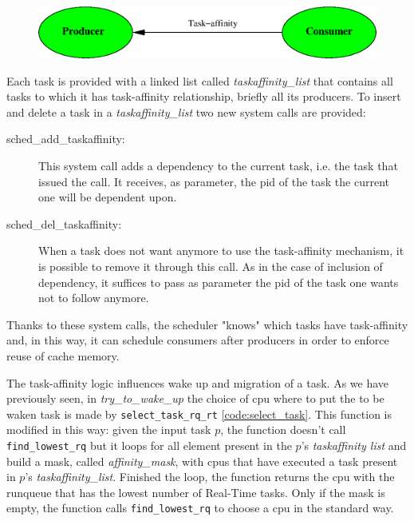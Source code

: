 \begin{figure}[htbp]
\centering
\includegraphics[width=\widefigure]{images/taskaff-rel.eps}
\caption{}
\label{fig:taskaff-rel}
\end{figure}

Each task is provided with a linked list called \textit{taskaffinity\_list} that contains all tasks to which it has task-affinity relationship, briefly 
all its producers. To insert and delete a task in a \textit{taskaffinity\_list} two new system calls are provided:

\begin{description}

\item[sched\_add\_taskaffinity:] This system call adds a dependency to the current task, i.e. the task that issued the call. It receives, as parameter, the 
pid of the task the current one will be dependent upon.

\item[sched\_del\_taskaffinity:] When a task does not want anymore to use the task-affinity mechanism, it is possible to remove it through this call.
As in the case of inclusion of dependency, it suffices to pass as parameter the pid of the task one wants not to follow anymore.

\end{description}

Thanks to these system calls, the scheduler "knows" which tasks have task-affinity and, in this way, it can schedule consumers after producers in order to 
enforce reuse of cache memory.

The task-affinity logic influences wake up and migration of a task. As we have previously seen, in \textit{try\_to\_wake\_up} the choice of cpu where to 
put the to be waken task is made by \texttt{select\_task\_rq\_rt} \ref{code:select_task}. This function is modified in this way: given the input task $p$, 
the function doesn't call \texttt{find\_lowest\_rq} but it loops for all element present in the $p$'s \textit{taskaffinity list} and build a mask, called 
\textit{affinity\_mask}, with cpus that have executed a task present in $p$'s \textit{taskaffinity\_list}. Finished the loop, the function returns the cpu 
with the runqueue that has the lowest number of Real-Time tasks. Only if the mask is empty, the function calls \texttt{find\_lowest\_rq} to choose a cpu
in the standard way. 

